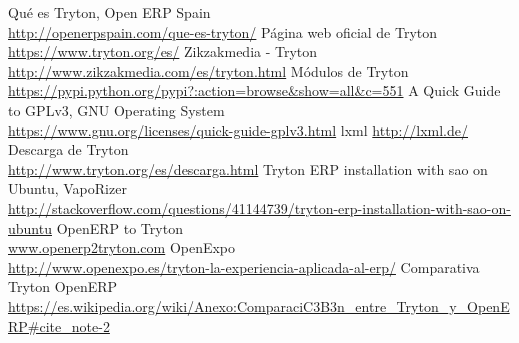     \begin{frame}
        \fontsize{6}{1}\selectfont
        \begin{thebibliography}{99}
             Qué es Tryton, Open ERP Spain\\ \url{http://openerpspain.com/que-es-tryton/}
             Página web oficial de Tryton \\ \url{https://www.tryton.org/es/}
             Zikzakmedia - Tryton \\ \url{http://www.zikzakmedia.com/es/tryton.html}
             Módulos de Tryton \\ \url{https://pypi.python.org/pypi?:action=browse&show=all&c=551}
             A Quick Guide to GPLv3, GNU Operating System \\ \url{https://www.gnu.org/licenses/quick-guide-gplv3.html}
             lxml \url{http://lxml.de/}
             Descarga de Tryton \\ \url{http://www.tryton.org/es/descarga.html}
             Tryton ERP installation with sao on Ubuntu, VapoRizer \\ \url{http://stackoverflow.com/questions/41144739/tryton-erp-installation-with-sao-on-ubuntu}
             OpenERP to Tryton\\ \url{www.openerp2tryton.com}
             OpenExpo \\ \url{http://www.openexpo.es/tryton-la-experiencia-aplicada-al-erp/}
             Comparativa Tryton OpenERP \\ \url{https://es.wikipedia.org/wiki/Anexo:ComparaciC3B3n\_entre\_Tryton\_y\_OpenERP\#cite\_note-2}
        \end{thebibliography}
    \end{frame}



